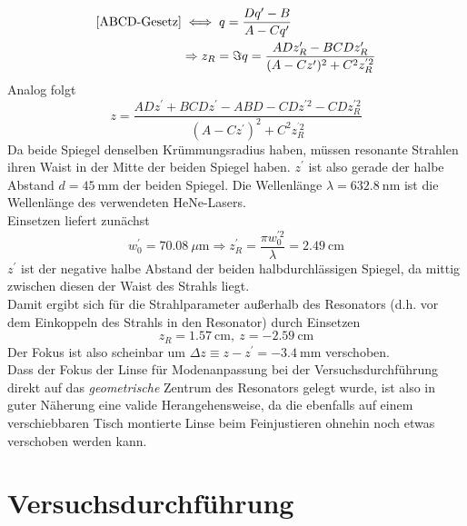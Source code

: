 \documentclass[11pt,a4paper,oneside]{scrartcl}
\begin{document}
\begin{align}
\ref{ABCD-Gesetz}& \iff q = \frac{Dq^\prime-B}{A-Cq^\prime}\\ & \Rightarrow z_R=\Im{q}%
=\frac{ADz_R^\prime-BCDz_R^\prime}{(A-Cz^\prime)^2+C^2z_R^{^\prime 2}}
\end{align}
Analog folgt 
\begin{equation}
z=\frac{ADz^\prime+BCDz^\prime-ABD-CDz^{\prime 2}-CDz_R^{\prime 2}}{(A-Cz^\prime)^2+C^2z_R^{^\prime 2}}
\end{equation}
Da beide Spiegel denselben Krümmungsradius haben, müssen resonante Strahlen ihren Waist in der Mitte der beiden Spiegel haben. $z^\prime$ ist also gerade der halbe Abstand $d=45\ \mathrm{mm}$ der beiden Spiegel. Die Wellenlänge $\lambda=632.8\ \mathrm{nm}$ ist die Wellenlänge des verwendeten HeNe-Lasers. \\
Einsetzen liefert zunächst
\begin{equation}
w_0^\prime = 70.08\ \mu\mathrm m\Rightarrow z_R^\prime = \frac{\pi w_0^{\prime 2}}{\lambda} = 2.49\ \mathrm{cm}
\end{equation}
 $z^\prime$ ist der negative halbe Abstand der beiden halbdurchlässigen Spiegel, da mittig zwischen diesen der Waist des Strahls liegt. \\
Damit ergibt sich für die Strahlparameter außerhalb des Resonators (d.h. vor dem Einkoppeln des Strahls in den Resonator) durch Einsetzen
\begin{equation}
z_R = 1.57\ \mathrm{cm},\ z = -2.59\ \mathrm{cm}
\end{equation}
Der Fokus ist also scheinbar um $\Delta z\equiv z-z^\prime = -3.4\ \mathrm{mm}$ verschoben. \\
Dass der Fokus der Linse für Modenanpassung bei der Versuchsdurchführung direkt auf das \emph{geometrische} Zentrum des Resonators gelegt wurde, ist also in guter Näherung eine valide Herangehensweise, da die ebenfalls auf einem verschiebbaren Tisch montierte Linse beim Feinjustieren ohnehin noch etwas verschoben werden kann.
\section{Versuchsdurchführung}
\end{document}
